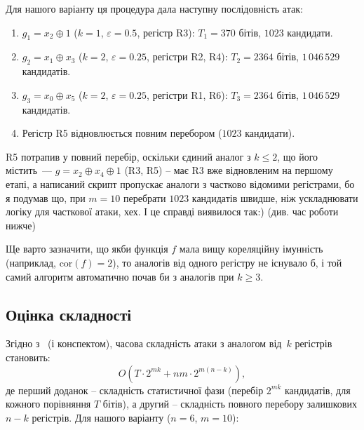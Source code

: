 \noindent Для нашого варіанту ця процедура дала наступну послідовність атак:

\begin{enumerate}
    \item $g_1 = x_2 \oplus 1$ ($k=1$, $\varepsilon = 0.5$, регістр R3):
    $T_1 = 370$ бітів, $1023$ кандидати.
    \item $g_2 = x_1 \oplus x_3$ ($k=2$, $\varepsilon = 0.25$, регістри R2, R4):
    $T_2 = 2364$ бітів, $1\,046\,529$ кандидатів.
    \item $g_3 = x_0 \oplus x_5$ ($k=2$, $\varepsilon = 0.25$, регістри R1, R6):
    $T_3 = 2364$ бітів, $1\,046\,529$ кандидатів.
    \item Регістр R5 відновлюється повним перебором ($1023$ кандидати).
\end{enumerate}

\begin{remark}
    R5 потрапив у повний перебір, оскільки єдиний аналог з $k \leq 2$, що його містить~--- $g = x_2 \oplus x_4 \oplus 1$ 
    (R3, R5) -- має R3 вже відновленим на першому етапі, а написаний скрипт пропускає аналоги з частково відомими 
    регістрами, бо я подумав що, при $m = 10$ перебрати $1023$ кандидатів швидше, ніж ускладнювати логіку для 
    часткової атаки, хех. І це справді виявилося так:) (див. час роботи нижче)
\end{remark}

\begin{remark}
    Ще варто зазначити, що якби функція $f$ мала вищу кореляційну імунність (наприклад, $\mathrm{cor}(f) = 2$), то 
    аналогів від одного регістру не існувало б, і той самий алгоритм автоматично почав би з аналогів при $k \geq 3$.
\end{remark}

\subsection{Оцінка складності}

Згідно з~\cite{siegenthaler1985} (і конспектом), часова складність атаки з аналогом від~$k$ регістрів становить:
\begin{equation*}
    O \left(T \cdot 2^{mk} + nm \cdot 2^{m(n-k)}\right),
\end{equation*}
де перший доданок -- складність статистичної фази (перебір $2^{mk}$ кандидатів, для кожного порівняння $T$ бітів), 
а другий -- складність повного перебору залишкових $n - k$ регістрів. Для нашого варіанту ($n = 6$, $m = 10$):

